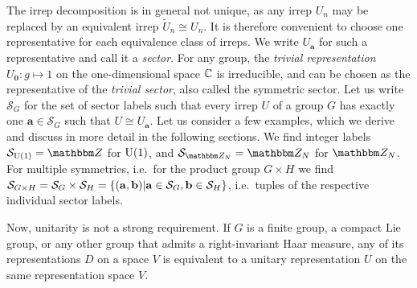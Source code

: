 The irrep decomposition is in general not unique, as any irrep $U_n$ may be replaced by an equivalent irrep $\tilde{U}_n \cong U_n$.
%
It is therefore convenient to choose one representative for each equivalence class of irreps.
%
We write $U_\mathbf{a}$ for such a representative and call it a \emph{sector}.
%
For any group, the \emph{trivial representation} $U_\mathbf{0} : g \mapsto 1$ on the one-dimensional space $\mathbb{C}$ is irreducible, and can be chosen as the representative of the \emph{trivial sector}, also called the symmetric sector.
%
Let us write $\mathcal{S}_G$ for the set of sector labels such that every irrep $U$ of a group $G$ has exactly one $\mathbf{a} \in \mathcal{S}_G$ such that $U \cong U_\mathbf{a}$.
%
Let us consider a few examples, which we derive and discuss in more detail in the following sections.
%
We find integer labels $\mathcal{S}_{\U{1}} = \Zbb$ for $\mathrm{U}(1)$, and $\mathcal{S}_{\Zbb_N} = \Zbb_N$ for $\Zbb_N$.
%
For multiple symmetries, i.e.~for the product group $G \times H$ we find $\mathcal{S}_{G \times H} = \mathcal{S}_{G} \times \mathcal{S}_{H} = \setdef{(\mathbf{a}, \mathbf{b})}{\mathbf{a} \in \mathcal{S}_{G}, \mathbf{b}\in \mathcal{S}_{H}}$, i.e.~tuples of the respective individual sector labels.

Now, unitarity is not a strong requirement.
%
If $G$ is a finite group, a compact Lie group, or any other group that admits a right-invariant Haar measure, any of its representations $D$ on a space $V$ is equivalent to a unitary representation $U$ on the same representation space $V$.

